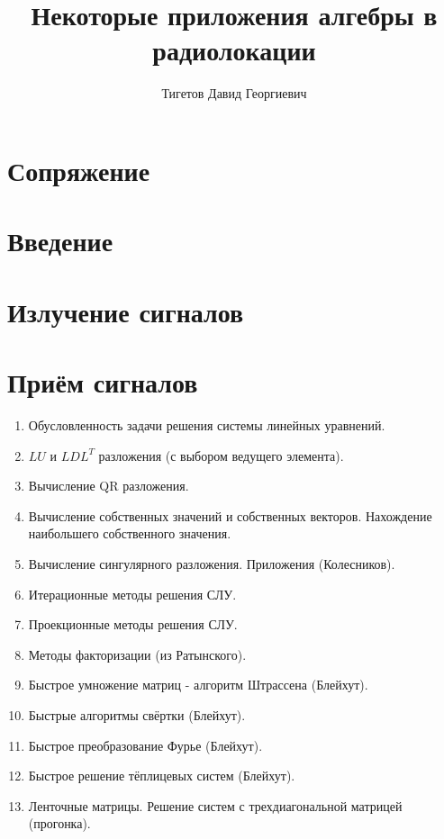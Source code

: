\documentclass[a4paper,12pt]{report}
\begin{document}
    \title{Некоторые приложения алгебры в радиолокации}
    \author{Тигетов Давид Георгиевич}
    \maketitle

    \tableofcontents


    \part{Сопряжение}
    


    \part{Введение}
    
    


    \part{Излучение сигналов}
    
    
    


    \part{Приём сигналов}
    
    
    
    
    
    

    

    \begin{enumerate}
        \item Обусловленность задачи решения системы линейных уравнений.
        \item $LU$ и $LDL^T$ разложения (с выбором ведущего элемента).
        \item Вычисление QR разложения.
        \item Вычисление собственных значений и собственных векторов. Нахождение наибольшего собственного значения.
        \item Вычисление сингулярного разложения. Приложения (Колесников).
        \item Итерационные методы решения СЛУ.
        \item Проекционные методы решения СЛУ.
        \item Методы факторизации (из Ратынского).
        \item Быстрое умножение матриц - алгоритм Штрассена (Блейхут).
        \item Быстрые алгоритмы свёртки (Блейхут).
        \item Быстрое преобразование Фурье (Блейхут).
        \item Быстрое решение тёплицевых систем (Блейхут).
        \item Ленточные матрицы. Решение систем с трехдиагональной матрицей (прогонка).
    \end{enumerate}
\end{document}
